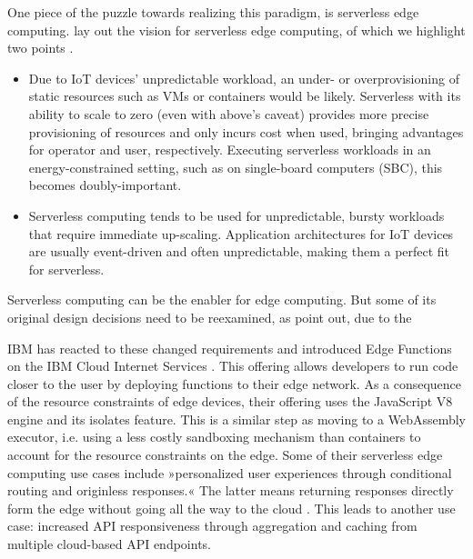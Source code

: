 One piece of the puzzle towards realizing this paradigm, is serverless edge computing. \citeauthor{Aslanpour2021} lay out the vision for serverless edge computing, of which we highlight two points \cite{Aslanpour2021}.

\begin{itemize}
    \item Due to IoT devices' unpredictable workload, an under- or overprovisioning of static resources such as VMs or containers would be likely. Serverless with its ability to scale to zero (even with above's caveat) provides more precise provisioning of resources and only incurs cost when used, bringing advantages for operator and user, respectively. Executing serverless workloads in an energy-constrained setting, such as on single-board computers (SBC), this becomes doubly-important.
    \item Serverless computing tends to be used for unpredictable, bursty workloads that require immediate up-scaling. Application architectures for IoT devices are usually event-driven and often unpredictable, making them a perfect fit for serverless.
\end{itemize}

Serverless computing can be the enabler for edge computing. But some of its original design decisions need to be reexamined, as \citeauthor{Nastic2018} point out, due to the

\begin{quote}
\end{quote}

IBM has reacted to these changed requirements and introduced Edge Functions on the IBM Cloud Internet Services \cite{Farid2019}. This offering allows developers to run code closer to the user by deploying functions to their edge network. As a consequence of the resource constraints of edge devices, their offering uses the JavaScript V8 engine and its isolates feature. This is a similar step as moving to a WebAssembly executor, i.e. using a less costly sandboxing mechanism than containers to account for the resource constraints on the edge. Some of their serverless edge computing use cases include »personalized user experiences through conditional routing and originless responses.« The latter means returning responses directly form the edge without going all the way to the cloud \cite{IBM2021}. This leads to another use case: increased API responsiveness through aggregation and caching from multiple cloud-based API endpoints.

